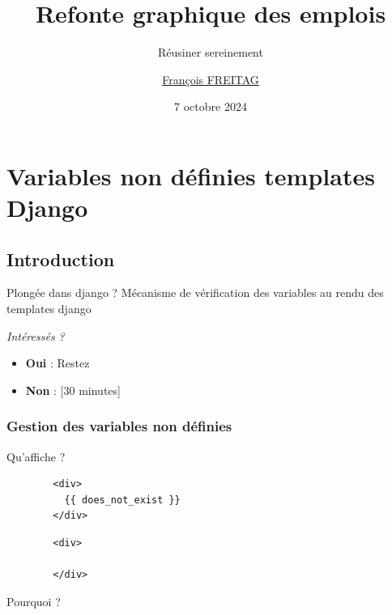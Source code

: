 \documentclass{beamer}
\title{Refonte graphique des emplois}
\subtitle{Réusiner sereinement}
\author{\href{mailto:mail@franek.fr}{François FREITAG}}
\institute{Les emplois de l'inclusion \\ GIP Inclusion}
\date{7 octobre 2024}
\begin{document}

\begin{frame}
	\maketitle %
\end{frame}


\section{Variables non définies templates Django} %

\subsection*{Introduction}

\begin{frame}{Plongée dans django ?}
    Mécanisme de vérification des variables au rendu des templates django

    \vspace{1cm}

    \textit{\huge Intéressés ?}

    \vspace{.5cm}
    \begin{itemize}
        \item {\large \textbf{Oui} : Restez}
        \item {\large \textbf{Non} :  [30 minutes]}
    \end{itemize}
\end{frame}

\begin{frame}[fragile]
    \frametitle{Gestion des variables non définies}

    Qu'affiche ?
    \begin{verbatim}
        <div>
          {{ does_not_exist }}
        </div>
    \end{verbatim}

    \pause

    \begin{verbatim}
        <div>

        </div>
    \end{verbatim}
    \pause

    Pourquoi ?
\end{frame}
\end{document}
